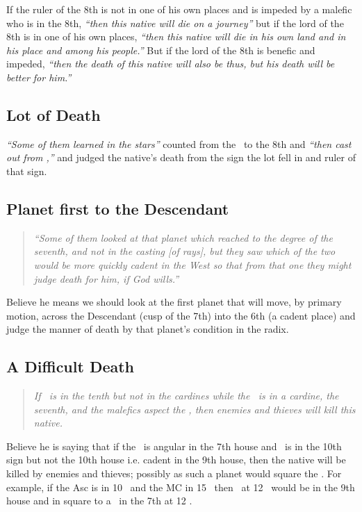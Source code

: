 If  the ruler of the 8th is not in one of his own places and is impeded by a malefic who is in the 8th, \textsl{``then this native will die on a journey''} but if the lord of the 8th is in one of his own places, \textsl{``then this native will die in his own land and in his place and among his people.''} But if the lord of the 8th is benefic and impeded, \textsl{``then the death of this native will also be thus, but his death will be better for him.''}

\subsection{Lot of Death}
\textsl{``Some of them learned in the stars''}  counted from the \Moon\, to the 8th and \textsl{``then cast out from \Saturn,''} and judged the native's death from the sign the lot fell in and ruler of that sign.

\subsection{Planet first to the Descendant}
\begin{quote}
\textsl{``Some of them looked at that planet which reached to the degree of the seventh, and not in the casting [of rays], but they saw which of the two would be more quickly cadent in the West so that from that one they might judge death for him, if God wills.''}
\end{quote}
Believe he means we should look at the first planet that will move, by primary motion, across the Descendant (cusp of the 7th) into the 6th (a cadent place) and judge the manner of death by that planet's condition in the radix.

\subsection{A Difficult Death}
\begin{quote}
\textsl{If \Mars\, is in the tenth but not in the cardines while the \Moon\, is in a cardine, the seventh, and the malefics aspect the \Moon, then enemies and thieves will kill this native.}
\end{quote}

Believe he is saying that if the \Moon\, is angular in the 7th house and \Mars\, is in the 10th sign but not the 10th house i.e. cadent in the 9th house, then the native will be killed by enemies and thieves; possibly as such a planet would square the \Moon. For example, if the Asc is in 10 \Taurus\, and the MC in 15 \Aquarius\, then \Mars\, at 12 \Aquarius\, would be in the 9th house and in square to a \Moon\, in the 7th at 12 \Scorpio.

